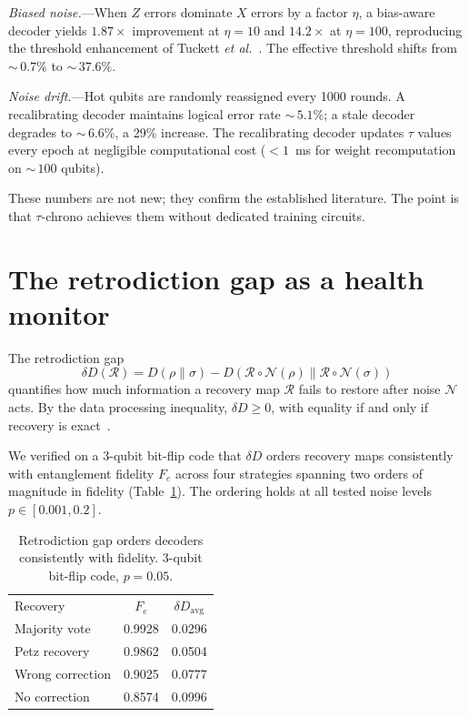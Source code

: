 \documentclass[prl,twocolumn,superscriptaddress,longbibliography]{revtex4-2}
\newcommand{\Petz}{\mathcal{R}}
\newcommand{\chan}{\mathcal{N}}
\newcommand{\dd}{\delta\!D}
\begin{document}
\emph{Biased noise.}---When $Z$ errors dominate $X$ errors by a factor $\eta$, a bias-aware decoder yields $1.87\times$ improvement at $\eta = 10$ and $14.2\times$ at $\eta = 100$, reproducing the threshold enhancement of Tuckett \emph{et al.}~\cite{Tuckett2018}. The effective threshold shifts from ${\sim}\,0.7\%$ to ${\sim}\,37.6\%$.

\emph{Noise drift.}---Hot qubits are randomly reassigned every 1000 rounds. A recalibrating decoder maintains logical error rate ${\sim}\,5.1\%$; a stale decoder degrades to ${\sim}\,6.6\%$, a 29\% increase. The recalibrating decoder updates $\tau$ values every epoch at negligible computational cost ($<1$~ms for weight recomputation on ${\sim}\,100$ qubits).

These numbers are not new; they confirm the established literature. The point is that $\tau$-chrono achieves them without dedicated training circuits.

\section{The retrodiction gap as a health monitor}

The retrodiction gap
\begin{equation}\label{eq:deltaD}
  \dd(\Petz) = D(\rho\|\sigma) - D(\Petz \circ \chan(\rho)\|\Petz \circ \chan(\sigma))
\end{equation}
quantifies how much information a recovery map $\Petz$ fails to restore after noise $\chan$ acts. By the data processing inequality, $\dd \geq 0$, with equality if and only if recovery is exact~\cite{Petz1986}.

We verified on a 3-qubit bit-flip code that $\dd$ orders recovery maps consistently with entanglement fidelity $F_e$ across four strategies spanning two orders of magnitude in fidelity (Table~\ref{tab:3qubit}). The ordering holds at all tested noise levels $p \in [0.001, 0.2]$.

\begin{table}[b]
\caption{\label{tab:3qubit}Retrodiction gap orders decoders consistently with fidelity. 3-qubit bit-flip code, $p = 0.05$.}
\begin{ruledtabular}
\begin{tabular}{lcc}
Recovery & $F_e$ & $\dd_{\text{avg}}$ \\
\colrule
Majority vote & 0.9928 & 0.0296 \\
Petz recovery & 0.9862 & 0.0504 \\
Wrong correction & 0.9025 & 0.0777 \\
No correction & 0.8574 & 0.0996 \\
\end{tabular}
\end{ruledtabular}
\end{table}
\end{document}

